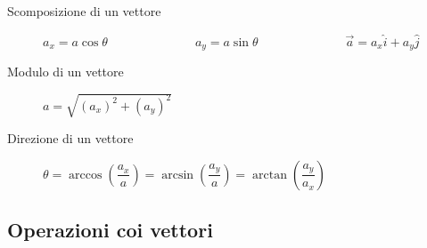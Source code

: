 \documentclass[a4paper,11pt,italian]{article}
\begin{document}
\begin{description}
  
  
  \item[Scomposizione di un vettore] $ a_x = a  \cos\theta $~~~~~~~~~~~~~~$ a_y = a  \sin\theta $~~~~~~~~~~~~~~$ \vec{a} = a_x \hat{i} + a_y \hat{j} $
  
  \item[Modulo di un vettore] $ a = \sqrt{(a_x)^2 + (a_y)^2} $
  \item[Direzione di un vettore] $ \theta  = \arccos\left( \dfrac{a_x}{a} \right) = \arcsin\left( \dfrac{a_y}{a} \right) = \arctan\left( \dfrac{a_y}{a_x} \right) $
\end{description}

\subsection{Operazioni coi vettori}
\end{document}
